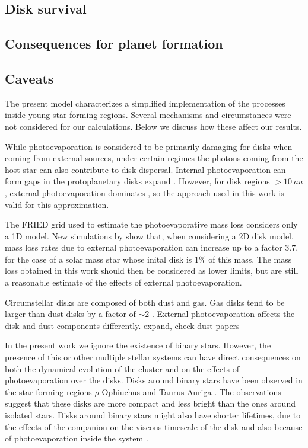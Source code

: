 \documentclass[fleqn,usenatbib]{mnras}
\newcommand\note[1]{{\colorbox{yellow!60}{\color{magenta}#1}}}
\begin{document}
\subsection{Disk survival}\label{discussion_disksurvival}

\subsection{Consequences for planet formation}\label{discussion_planetformation}

\subsection{Caveats}\label{caveats}
The present model characterizes a simplified implementation of the processes inside young star forming regions. Several mechanisms and circumstances were not considered for our calculations. Below we discuss how these affect our results.

While photoevaporation is considered to be primarily damaging for disks when coming from external sources, under certain regimes the photons coming from the host star can also contribute to disk dispersal. Internal photoevaporation can form gaps in the protoplanetary disks \note{expand} \citep{gorti2009, gorti2015}. However, for disk regions $> \SI{10}{au}$, external photoevaporation dominates \citep{fatuzzo2008, hollenbach2000}, so the approach used in this work is valid for this approximation. 

The FRIED grid used to estimate the photoevaporative mass loss considers only a 1D model. New simulations by \citet{haworth2019} show that, when considering a 2D disk model, mass loss rates due to external photoevaporation can increase up to a factor 3.7, for the case of a solar mass star whose inital disk is $1\%$ of this mass. The mass loss obtained in this work should then be considered as lower limits, but are still a reasonable estimate of the effects of external photoevaporation.

Circumstellar disks are composed of both dust and gas. Gas disks tend to be larger than dust disks by a factor of $\sim2$ \citep{ansdell2018}. External photoevaporation affects the disk and dust components differently. \note{expand, check dust papers}

In the present work we ignore the existence of binary stars. However, the presence of this or other multiple stellar systems can have direct consequences on both the dynamical evolution of the cluster and on the effects of photoevaporation over the disks. Disks around binary stars have been observed in the star forming regions $\rho$ Ophiuchus \citep{cox2017} and Taurus-Auriga \citep{harris2012,akeson2014,akeson2019}. The observations suggest that these disks are more compact and less bright than the ones around isolated stars. Disks around binary stars might also have shorter lifetimes, due to the effects of the companion on the viscous timescale of the disk and also because of photoevaporation inside the system \citep{shadmehri2018,rosotti2018a}.
\end{document}
